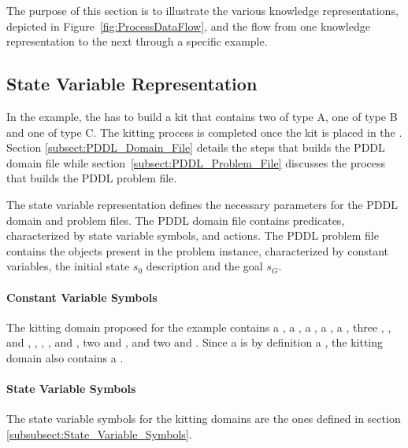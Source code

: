 The purpose of this section is to illustrate the various knowledge representations, depicted in Figure~\ref{fig:ProcessDataFlow}, and the flow from one knowledge representation to the next through a specific example.

\subsection{State Variable Representation}

In the example, the  has to build a kit that contains two  of type A, one  of type B and one  of type C. The kitting process is completed once the kit is placed in the . Section \ref{subsect:PDDL_Domain_File} details the steps that builds the PDDL domain file while section~\ref{subsect:PDDL_Problem_File} discusses the process that builds the PDDL problem file.

The state variable representation defines the necessary parameters for the PDDL domain and problem files. The PDDL domain file contains predicates, characterized by state variable symbols, and actions. The PDDL problem file contains the objects present in the problem instance, characterized by constant variables, the initial state $s_0$ description and the goal $s_G$.



\paragraph{Constant Variable Symbols}
The kitting domain proposed for the example contains a  , a  , a  , a  , a  , three  , , and ,  , , , and , two   and , and two    and . Since a  is by definition a , the kitting domain also contains a  .

\paragraph{State Variable Symbols}
The state variable symbols for the kitting domains are the ones defined in section \ref{subsubsect:State_Variable_Symbols}.

